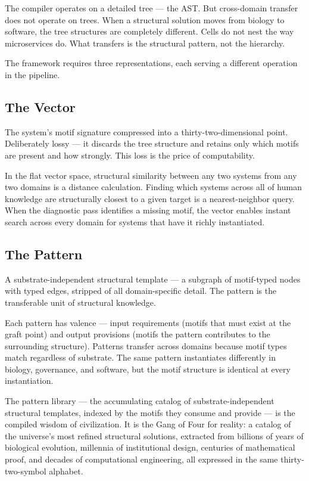 \documentclass[11pt,a4paper]{article}
\begin{document}
The compiler operates on a detailed tree --- the AST. But cross-domain transfer does not operate on trees. When a structural solution moves from biology to software, the tree structures are completely different. Cells do not nest the way microservices do. What transfers is the structural pattern, not the hierarchy.

The framework requires three representations, each serving a different operation in the pipeline.

\subsection{The Vector}

The system's motif signature compressed into a thirty-two-dimensional point. Deliberately lossy --- it discards the tree structure and retains only which motifs are present and how strongly. This loss is the price of computability.

In the flat vector space, structural similarity between any two systems from any two domains is a distance calculation. Finding which systems across all of human knowledge are structurally closest to a given target is a nearest-neighbor query. When the diagnostic pass identifies a missing motif, the vector enables instant search across every domain for systems that have it richly instantiated.

\subsection{The Pattern}

A substrate-independent structural template --- a subgraph of motif-typed nodes with typed edges, stripped of all domain-specific detail. The pattern is the transferable unit of structural knowledge.

Each pattern has valence --- input requirements (motifs that must exist at the graft point) and output provisions (motifs the pattern contributes to the surrounding structure). Patterns transfer across domains because motif types match regardless of substrate. The same pattern instantiates differently in biology, governance, and software, but the motif structure is identical at every instantiation.

The pattern library --- the accumulating catalog of substrate-independent structural templates, indexed by the motifs they consume and provide --- is the compiled wisdom of civilization. It is the Gang of Four for reality: a catalog of the universe's most refined structural solutions, extracted from billions of years of biological evolution, millennia of institutional design, centuries of mathematical proof, and decades of computational engineering, all expressed in the same thirty-two-symbol alphabet.
\end{document}
